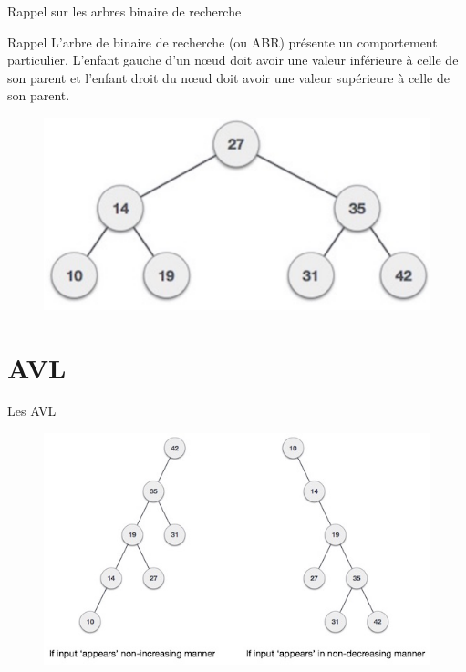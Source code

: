 \documentclass[10pt,xcolor=dvipsnames]{beamer}
\newcommand{\defin}[1]{\textcolor{darkspringgreen}{#1}}
\begin{document}
\begin{frame}{Rappel sur les arbres binaire de recherche}
\begin{exampleblock}{Rappel}
     \defin{L'arbre de binaire de recherche} (ou ABR)  présente un comportement particulier. L'enfant gauche d'un nœud doit avoir une valeur inférieure à celle de son parent et l'enfant droit du nœud doit avoir une valeur supérieure à celle de son parent.     
\end{exampleblock}

    
    \begin{figure}
    \centering
    \includegraphics[scale=0.3]{figures/CM2/ABR-2.png}
    \label{fig:my_label}
\end{figure}
    
\end{frame}

\section{AVL}

\begin{frame}{Les AVL}
    \begin{figure}
        \centering
        \includegraphics[scale=0.4]{figures/CM3/AVL-unbalanced.jpg}
        \label{fig:my_label}
    \end{figure}
    
\end{frame}
\end{document}
